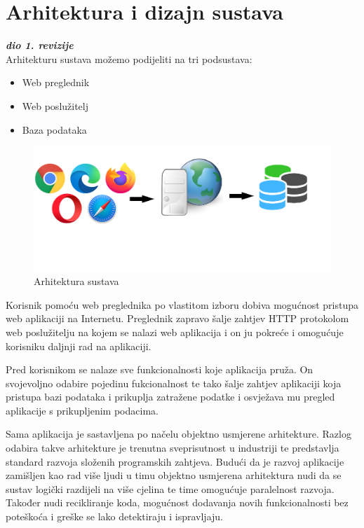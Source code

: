 \chapter{Arhitektura i dizajn sustava}
		
		\textbf{\textit{dio 1. revizije}}\\

		
		Arhitekturu sustava možemo podijeliti na tri podsustava:
		\begin{itemize}
			\item Web preglednik
			\item Web poslužitelj
			\item Baza podataka
		\end{itemize}
	
		
		\begin{figure}[H]
			\includegraphics[scale=0.35]{slike/arhitektura.png} %
			\centering
			\caption {Arhitektura sustava}
			\label{fig:promjene}
		\end{figure}
		
		Korisnik pomoću web preglednika po vlastitom izboru dobiva mogućnost  pristupa web aplikaciji na  Internetu. Preglednik zapravo šalje zahtjev HTTP protokolom web poslužitelju na kojem se nalazi web aplikacija i on ju pokreće i omogućuje korisniku daljnji rad na aplikaciji.
		
		Pred korisnikom se nalaze sve funkcionalnosti koje aplikacija pruža. On svojevoljno odabire pojedinu fukcionalnost te tako šalje zahtjev aplikaciji koja pristupa bazi podataka i prikuplja zatražene podatke i osvježava mu pregled aplikacije s prikupljenim podacima. 

		Sama aplikacija je sastavljena po načelu objektno usmjerene arhitekture. Razlog odabira takve arhitekture je trenutna sveprisutnost u industriji te predstavlja standard razvoja složenih programskih zahtjeva. Budući da je razvoj aplikacije zamišljen kao rad više ljudi u timu  objektno usmjerena arhitektura nudi da se sustav logički razdijeli na više cjelina te time omogućuje paralelnost razvoja.
		Također nudi recikliranje koda, mogućnost dodavanja novih funkcionalnosti bez poteškoća i greške se lako detektiraju i ispravljaju.
		

